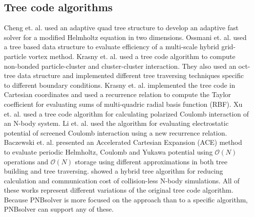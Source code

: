 \documentclass[draftclsnofoot]{elsarticle}
\begin{document}
\subsection{Tree code algorithms}
Cheng et. al. \cite{cheng} used an adaptive quad tree structure to develop an adaptive fast solver for a modified Helmholtz equation in
two dimensions. Ossmani et. al. \cite{ossmani} used a tree based data structure to evaluate efficiency of a multi-scale hybrid 
grid-particle vortex method. Krasny et. al.  \cite{krasny1} used a tree code algorithm to compute non-bonded particle-cluster and 
cluster-cluster interaction. They also used an oct-tree data structure and implemented different tree traversing techniques specific to different 
boundary conditions. Krasny et. al. \cite{krasny2} implemented the tree code in Cartesian coordinates and used a recurrence relation 
to compute the Taylor coefficient for evaluating sums of multi-quadric radial basis function (RBF). Xu et. al. \cite{xu} used a tree code 
algorithm for calculating polarized Coulomb interaction of an N-body system. Li et. al. \cite{li} used the algorithm
for evaluating electrostatic potential of screened Coulomb interaction using a new recurrence relation. 
Baczewski et. al. \cite{baczewski} presented an Accelerated Cartesian Expansion (ACE) method to evaluate periodic 
Helmholtz, Coulomb and Yukawa potential using $\mathcal{O}(N)$ operations and $\mathcal{O}(N)$ storage using different approximations in
both tree building and tree traversing.  \cite{hybridtree2015} showed a hybrid tree algorithm for reducing calculation and communication cost of 
collision-less N-body simulations.
All of these works represent different variations of the original tree code algorithm.
Because PNBsolver is more focused on the approach than to a specific algorithm, PNBsolver can support any of these. 
\end{document}

